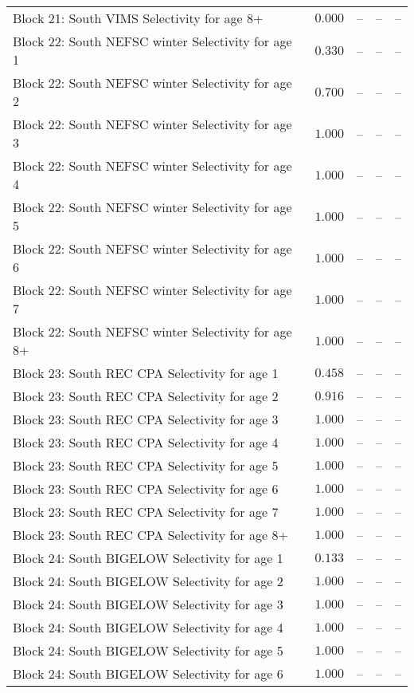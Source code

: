 \documentclass[
]{article}
\begin{document}
\begin{landscape}
\begin{longtable}[t]{lrrrr}
Block 21: South VIMS Selectivity for age 8+ & $0.000$ & -- & -- & --\\
\addlinespace
Block 22: South NEFSC winter Selectivity for age 1 & $0.330$ & -- & -- & --\\
Block 22: South NEFSC winter Selectivity for age 2 & $0.700$ & -- & -- & --\\
Block 22: South NEFSC winter Selectivity for age 3 & $1.000$ & -- & -- & --\\
Block 22: South NEFSC winter Selectivity for age 4 & $1.000$ & -- & -- & --\\
Block 22: South NEFSC winter Selectivity for age 5 & $1.000$ & -- & -- & --\\
\addlinespace
Block 22: South NEFSC winter Selectivity for age 6 & $1.000$ & -- & -- & --\\
Block 22: South NEFSC winter Selectivity for age 7 & $1.000$ & -- & -- & --\\
Block 22: South NEFSC winter Selectivity for age 8+ & $1.000$ & -- & -- & --\\
Block 23: South REC CPA Selectivity for age 1 & $0.458$ & -- & -- & --\\
Block 23: South REC CPA Selectivity for age 2 & $0.916$ & -- & -- & --\\
\addlinespace
Block 23: South REC CPA Selectivity for age 3 & $1.000$ & -- & -- & --\\
Block 23: South REC CPA Selectivity for age 4 & $1.000$ & -- & -- & --\\
Block 23: South REC CPA Selectivity for age 5 & $1.000$ & -- & -- & --\\
Block 23: South REC CPA Selectivity for age 6 & $1.000$ & -- & -- & --\\
Block 23: South REC CPA Selectivity for age 7 & $1.000$ & -- & -- & --\\
\addlinespace
Block 23: South REC CPA Selectivity for age 8+ & $1.000$ & -- & -- & --\\
Block 24: South BIGELOW Selectivity for age 1 & $0.133$ & -- & -- & --\\
Block 24: South BIGELOW Selectivity for age 2 & $1.000$ & -- & -- & --\\
Block 24: South BIGELOW Selectivity for age 3 & $1.000$ & -- & -- & --\\
Block 24: South BIGELOW Selectivity for age 4 & $1.000$ & -- & -- & --\\
\addlinespace
Block 24: South BIGELOW Selectivity for age 5 & $1.000$ & -- & -- & --\\
Block 24: South BIGELOW Selectivity for age 6 & $1.000$ & -- & -- & --\\

\end{longtable}
\end{landscape}
\end{document}
